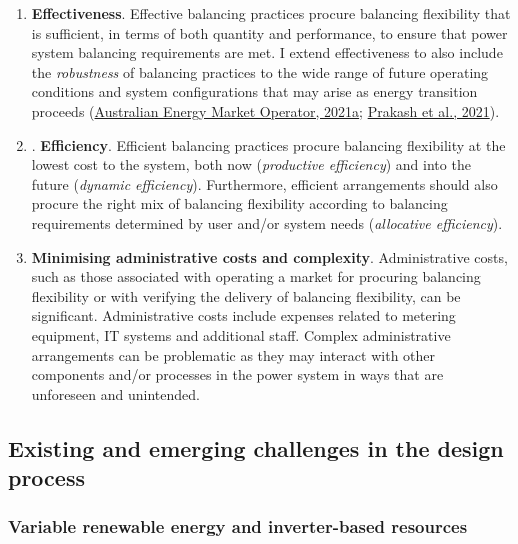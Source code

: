 \documentclass[12pt,a4paper,]{report}
\begin{document}
\begin{enumerate}
\def\labelenumi{\arabic{enumi}.}
\item
  \textbf{Effectiveness}. Effective balancing practices procure
  balancing flexibility that is sufficient, in terms of both quantity
  and performance, to ensure that power system balancing requirements
  are met. I extend effectiveness to also include the \emph{robustness}
  of balancing practices to the wide range of future operating
  conditions and system configurations that may arise as energy
  transition proceeds
  (\protect\hyperlink{ref-australianenergymarketoperatorEnduringPrimaryFrequency2021}{Australian
  Energy Market Operator, 2021a};
  \protect\hyperlink{ref-prakashResponseFrequencyControl2021}{Prakash et
  al., 2021}).
\item
  . \textbf{Efficiency}. Efficient balancing practices procure balancing
  flexibility at the lowest cost to the system, both now
  (\emph{productive efficiency}) and into the future (\emph{dynamic
  efficiency}). Furthermore, efficient arrangements should also procure
  the right mix of balancing flexibility according to balancing
  requirements determined by user and/or system needs (\emph{allocative
  efficiency}).
\item
  \textbf{Minimising administrative costs and complexity}.
  Administrative costs, such as those associated with operating a market
  for procuring balancing flexibility or with verifying the delivery of
  balancing flexibility, can be significant. Administrative costs
  include expenses related to metering equipment, IT systems and
  additional staff. Complex administrative arrangements can be
  problematic as they may interact with other components and/or
  processes in the power system in ways that are unforeseen and
  unintended.
\end{enumerate}

\hypertarget{sec:lit_review-design_challenges}{%
\subsection{Existing and emerging challenges in the design
process}\label{sec:lit_review-design_challenges}}

\hypertarget{variable-renewable-energy-and-inverter-based-resources}{%
\subsubsection{Variable renewable energy and inverter-based
resources}\label{variable-renewable-energy-and-inverter-based-resources}}
\end{document}
